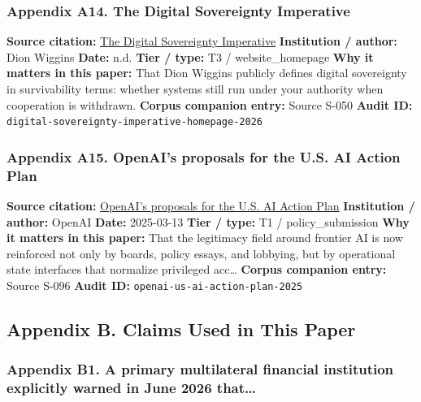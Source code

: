 \documentclass[
  american,
  11pt,
  letterpaper,
]{article}
\begin{document}
\subsubsection{Appendix A14. The Digital Sovereignty
Imperative}\label{ch-09-appendix-a14-the-digital-sovereignty-imperative}

\textbf{Source citation:}
\href{https://digitalsovereigntyimperative.com/}{The Digital Sovereignty
Imperative} \textbf{Institution / author:} Dion Wiggins \textbf{Date:}
n.d. \textbf{Tier / type:} T3 / website\_homepage \textbf{Why it matters
in this paper:} That Dion Wiggins publicly defines digital sovereignty
in survivability terms: whether systems still run under your authority
when cooperation is withdrawn. \textbf{Corpus companion entry:} Source
S-050 \textbf{Audit ID:}
\texttt{digital-sovereignty-imperative-homepage-2026}

\subsubsection{Appendix A15. OpenAI's proposals for the U.S. AI Action
Plan}\label{ch-09-appendix-a15-openais-proposals-for-the-us-ai-action-plan}

\textbf{Source citation:}
\href{https://openai.com/global-affairs/openai-proposals-for-the-us-ai-action-plan/}{OpenAI's
proposals for the U.S. AI Action Plan} \textbf{Institution / author:}
OpenAI \textbf{Date:} 2025-03-13 \textbf{Tier / type:} T1 /
policy\_submission \textbf{Why it matters in this paper:} That the
legitimacy field around frontier AI is now reinforced not only by
boards, policy essays, and lobbying, but by operational state interfaces
that normalize privileged acc\ldots{} \textbf{Corpus companion entry:}
Source S-096 \textbf{Audit ID:} \texttt{openai-us-ai-action-plan-2025}

\subsection{Appendix B. Claims Used in This
Paper}\label{appendix-b.-claims-used-in-this-paper-9}

\subsubsection{Appendix B1. A primary multilateral financial institution
explicitly warned in June 2026
that\ldots{}}\label{ch-09-appendix-b1-a-primary-multilateral-financial-institution-explicitly-warned-in-june-2026-that}
\end{document}
